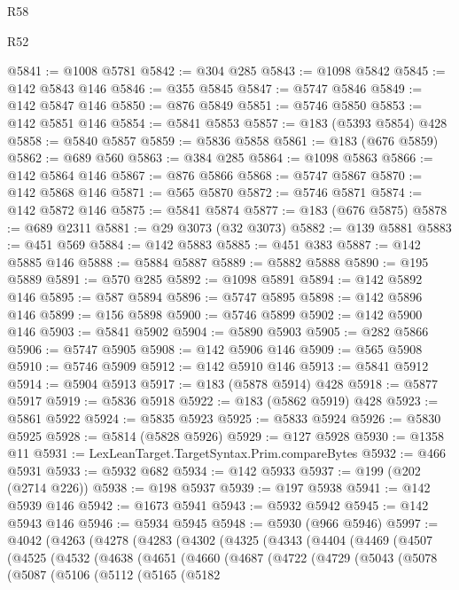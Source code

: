 \begin{lexlean}{R58}
\begin{lexlean}{R52}
\begin{coremodule}
{{{{{{{{{{{{{{{{{{{{{{{{{{{{{{{{{{{{{{{{{{{{{{{{{{{{{{{{{{{{{{{{{{{{{{{{{{{{{{{{{{{{{{{{{{{{{{{{{{{{{{{{{{{{{{{{{{{{{{{{{{{{{{{{{{{{{{{{{{{{{{{{{{{{{{{{{{{{{{{{{{{{{{{{{{{{{{{{{{{{{{{{{{{{{{{{{{{{{{@5841 := @1008 @5781
@5842 := @304 @285
@5843 := @1098 @5842
@5845 := @142 @5843 @146
@5846 := @355 @5845
@5847 := @5747 @5846
@5849 := @142 @5847 @146
@5850 := @876 @5849
@5851 := @5746 @5850
@5853 := @142 @5851 @146
@5854 := @5841 @5853
@5857 := @183 (@5393 @5854) @428
@5858 := @5840 @5857
@5859 := @5836 @5858
@5861 := @183 (@676 @5859)
@5862 := @689 @560
@5863 := @384 @285
@5864 := @1098 @5863
@5866 := @142 @5864 @146
@5867 := @876 @5866
@5868 := @5747 @5867
@5870 := @142 @5868 @146
@5871 := @565 @5870
@5872 := @5746 @5871
@5874 := @142 @5872 @146
@5875 := @5841 @5874
@5877 := @183 (@676 @5875)
@5878 := @689 @2311
@5881 := @29 @3073 (@32 @3073)
@5882 := @139 @5881
@5883 := @451 @569
@5884 := @142 @5883
@5885 := @451 @383
@5887 := @142 @5885 @146
@5888 := @5884 @5887
@5889 := @5882 @5888
@5890 := @195 @5889
@5891 := @570 @285
@5892 := @1098 @5891
@5894 := @142 @5892 @146
@5895 := @587 @5894
@5896 := @5747 @5895
@5898 := @142 @5896 @146
@5899 := @156 @5898
@5900 := @5746 @5899
@5902 := @142 @5900 @146
@5903 := @5841 @5902
@5904 := @5890 @5903
@5905 := @282 @5866
@5906 := @5747 @5905
@5908 := @142 @5906 @146
@5909 := @565 @5908
@5910 := @5746 @5909
@5912 := @142 @5910 @146
@5913 := @5841 @5912
@5914 := @5904 @5913
@5917 := @183 (@5878 @5914) @428
@5918 := @5877 @5917
@5919 := @5836 @5918
@5922 := @183 (@5862 @5919) @428
@5923 := @5861 @5922
@5924 := @5835 @5923
@5925 := @5833 @5924
@5926 := @5830 @5925
@5928 := @5814 (@5828 @5926)
@5929 := @127 @5928
@5930 := @1358 @11
@5931 := LexLeanTarget.TargetSyntax.Prim.compareBytes
@5932 := @466 @5931
@5933 := @5932 @682
@5934 := @142 @5933
@5937 := @199 (@202 (@2714 @226))
@5938 := @198 @5937
@5939 := @197 @5938
@5941 := @142 @5939 @146
@5942 := @1673 @5941
@5943 := @5932 @5942
@5945 := @142 @5943 @146
@5946 := @5934 @5945
@5948 := @5930 (@966 @5946)
@5997 := @4042
    (@4263
      (@4278
        (@4283
          (@4302
            (@4325
              (@4343
                (@4404
                  (@4469
                    (@4507
                      (@4525
                        (@4532
                          (@4638
                            (@4651
                              (@4660
                                (@4687
                                  (@4722
                                    (@4729
                                      (@5043
                                        (@5078
                                          (@5087
                                            (@5106
                                              (@5112
                                                (@5165
                                                  (@5182
}}}}}}}}}}}}}}}}}}}}}}}}}}}}}}}}}}}}}}}}}}}}}}}}}}}}}}}}}}}}}}}}}}}}}}}}}}}}}}}}}}}}}}}}}}}}}}}}}}}}}}}}}}}}}}}}}}}}}}}}}}}}}}}}}}}}}}}}}}}}}}}}}}}}}}}}}}}}}}}}}}}}}}}}}}}}}}}}}}}}}}}}}}}}}}}}}}}}}}
\end{coremodule}
\end{lexlean}
\end{lexlean}
